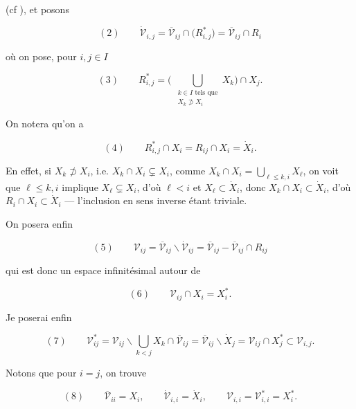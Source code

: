 \documentclass[11pt,a4paper]{article}
\begin{document}
(cf \ill), et posons

\[
  (2) \qquad
  \dot{\mathcal{V}}_{i,j}
  = \overline{\mathcal{V}}_{ij} \cap \bigl( R^{*}_{i,j} \bigr)
  = \overline{\mathcal{V}}_{ij} \cap R_i
\]


où on pose, pour $i,j \in I$

\[
  (3) \qquad
  R^{*}_{i,j} = \Biggl(\ \bigcup_{\substack{k \in I \text{ tels que} \\ X_k \not\supset X_i}} X_k \Biggr) \cap X_j .
\]



On notera qu'on a \struck{\ill}

\[
  (4) \qquad
  R^{*}_{i,j} \cap X_i = R_{ij} \cap X_i = \dot{X}_i .
\]

En effet, si $X_k \not\supset X_i$, i.e. $X_k \cap X_i \subsetneq X_i$, comme
$X_k \cap X_i = \bigcup_{\ell \leq k,i} X_\ell$, on voit que
\struck{\ill} $\ell \leq k,i$ implique $X_\ell \subsetneq X_i$, d'où
$\ell < i$ et $X_\ell \subset \dot{X}_i$, donc
$X_k \cap X_i \subset \dot{X}_i$, d'où $R_i \cap X_i \subset \dot{X}_i$ —
l'inclusion en sens inverse étant triviale.

On posera enfin

\[
  (5) \qquad
  \mathcal{V}_{ij}
  = \overline{\mathcal{V}}_{ij} \smallsetminus \dot{\mathcal{V}}_{ij}
  = \overline{\mathcal{V}}_{ij} - \overline{\mathcal{V}}_{ij} \cap R_{ij}
\]

qui est donc un espace infinitésimal autour de

\[
  (6) \qquad \mathcal{V}_{ij} \cap X_i = X_i^{*} .
\]

Je poserai enfin

\[
  (7) \qquad
  \mathcal{V}^{*}_{ij}
  = \mathcal{V}_{ij} \smallsetminus \bigcup_{k < j} X_k \cap \overline{\mathcal{V}}_{ij}
  = \overline{\mathcal{V}}_{ij} \smallsetminus \dot{X}_j
  = \mathcal{V}_{ij} \cap X_j^{*} \subset \mathcal{V}_{i,j} .
\]

Notons que pour $i = j$, on trouve

\[
  (8) \qquad
  \overline{\mathcal{V}}_{ii} = X_i , \qquad
  \dot{\mathcal{V}}_{i,i} = \dot{X}_i , \qquad
  \mathcal{V}_{i,i} = \mathcal{V}^{*}_{i,i} = X_i^{*} .
\]
\end{document}
